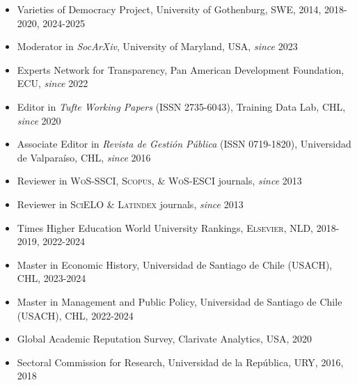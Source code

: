 





\begin{publications}

\begin{itemize}
\item{\small Varieties of Democracy Project, University of Gothenburg, SWE, 2014, 2018-2020, 2024-2025}
\item{\small Moderator in {\itshape SocArXiv}, University of Maryland, USA, {\itshape since} 2023}
\item{\small Experts Network for Transparency, Pan American Development Foundation, ECU, {\itshape since} 2022}
\item{\small Editor in {\itshape Tufte Working Papers} (ISSN 2735-6043), Training Data Lab, CHL, {\itshape since} 2020}
\item{\small Associate Editor in {\itshape Revista de Gestión Pública} (ISSN 0719-1820), Universidad de Valparaíso, CHL, {\itshape since} 2016}
\item{\small Reviewer in {\scshape WoS-SSCI}, {\scshape Scopus}, \& {\scshape WoS-ESCI} journals, {\itshape since} 2013}
\item{\small Reviewer in {\scshape SciELO} \& {\scshape Latindex} journals, {\itshape since} 2013}
\item{\small Times Higher Education World University Rankings, {\scshape Elsevier}, NLD, 2018-2019, 2022-2024}
\item{\small Master in Economic History, Universidad de Santiago de Chile (USACH), CHL, 2023-2024}
\item{\small Master in Management and Public Policy, Universidad de Santiago de Chile (USACH), CHL, 2022-2024}
\item{\small Global Academic Reputation Survey, Clarivate Analytics, USA, 2020}
\item{\small Sectoral Commission for Research, Universidad de la República, URY, 2016, 2018}
\end{itemize}

\vspace{1mm}
\end{publications}
